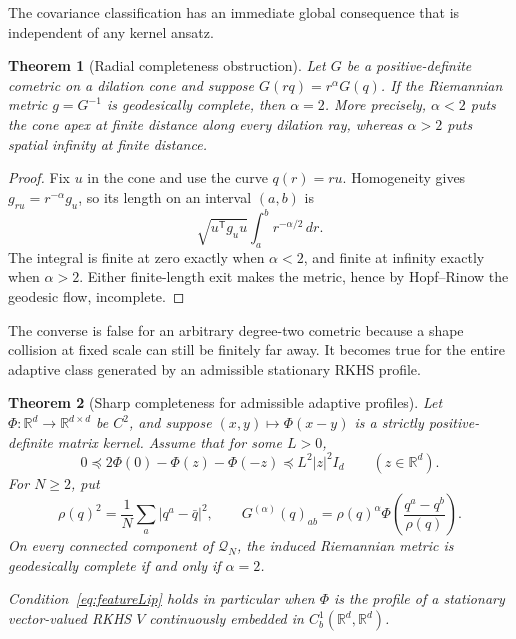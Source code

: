 \documentclass[11pt]{article}
\newtheorem{theorem}{Theorem}
\newcommand{\R}{\mathbb{R}}
\newcommand{\Q}{\mathcal{Q}}
\begin{document}
The covariance classification has an immediate global consequence that is
independent of any kernel ansatz.

\begin{theorem}[Radial completeness obstruction]
\label{thm:radial}
Let \(G\) be a positive-definite cometric on a dilation cone and suppose
\(G(rq)=r^\alpha G(q)\).  If the Riemannian metric \(g=G^{-1}\) is
geodesically complete, then \(\alpha=2\).
More precisely, \(\alpha<2\) puts the cone apex at finite distance along every
dilation ray, whereas \(\alpha>2\) puts spatial infinity at finite distance.
\end{theorem}

\begin{proof}
Fix \(u\) in the cone and use the curve \(q(r)=ru\).  Homogeneity gives
\(g_{ru}=r^{-\alpha}g_u\), so its length on an interval \((a,b)\) is
\[
 \sqrt{u^{\mathsf T}g_u u}\int_a^b r^{-\alpha/2}\,dr.
\]
The integral is finite at zero exactly when \(\alpha<2\), and finite at
infinity exactly when \(\alpha>2\).  Either finite-length exit makes the
metric, hence by Hopf--Rinow the geodesic flow, incomplete.
\end{proof}

The converse is false for an arbitrary degree-two cometric because a shape
collision at fixed scale can still be finitely far away.  It becomes true
for the entire adaptive class generated by an admissible stationary RKHS
profile.

\begin{theorem}[Sharp completeness for admissible adaptive profiles]
\label{thm:adaptivecomplete}
Let \(\Phi:\R^d\to\R^{d\times d}\) be \(C^2\), and suppose
\((x,y)\mapsto\Phi(x-y)\) is a strictly positive-definite matrix kernel.
Assume that for some \(L>0\),
\begin{equation}
 0\preccurlyeq
 2\Phi(0)-\Phi(z)-\Phi(-z)
 \preccurlyeq L^2|z|^2I_d
 \qquad(z\in\R^d).
 \label{eq:featureLip}
\end{equation}
For \(N\ge2\), put
\[
 \rho(q)^2=\frac1N\sum_a|q^a-\bar q|^2,
 \qquad
 G^{(\alpha)}(q)_{ab}
 =\rho(q)^\alpha
 \Phi\left(\frac{q^a-q^b}{\rho(q)}\right).
\]
On every connected component of \(\Q_N\), the induced Riemannian metric is
geodesically complete if and only if \(\alpha=2\).

Condition~\eqref{eq:featureLip} holds in particular when \(\Phi\) is the
profile of a stationary vector-valued RKHS \(V\) continuously embedded in
\(C_b^1(\R^d,\R^d)\).
\end{theorem}
\end{document}
